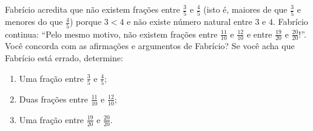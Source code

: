 \begin{atividade}
\label{chap4-ativ25}

Fabrício acredita que não existem frações entre $\frac{3}{5}$ e $\frac{4}{5}$ (isto é, maiores de que $\frac{3}{5}$ e menores do que $\frac{4}{5}$) porque $3 < 4$ e não existe número natural entre $3$ e $4$. Fabrício continua: ``Pelo mesmo motivo, não existem frações entre $\frac{11}{10}$ e $\frac{12}{10}$ e entre $\frac{19}{20}$ e $\frac{20}{20}$!''. Você concorda com as afirmações e argumentos de Fabrício? Se você acha que Fabrício está errado, determine:

\begin{enumerate}
\item  Uma fração entre $\frac{3}{5}$ e $\frac{4}{5}$;

\item  Duas frações entre $\frac{11}{10}$ e $\frac{12}{10}$;

\item  Uma fração entre $\frac{19}{20}$ e $\frac{20}{20}$.
\end{enumerate}
\end{atividade}

\clearpage

